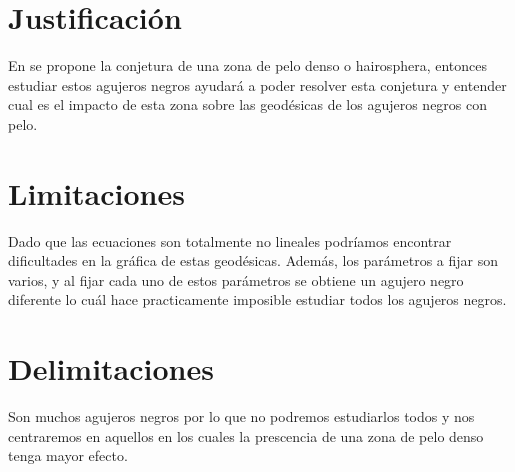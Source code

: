 \documentclass[../Main.tex]{subfiles}
\begin{document}
\section{Justificación}
En \cite{Nunez:1996xv} se propone la conjetura de una zona de pelo denso o hairosphera, entonces estudiar estos agujeros negros ayudará a poder resolver esta conjetura y entender cual es el impacto de esta zona sobre las geodésicas de los agujeros negros con pelo.

\section{Limitaciones}
Dado que las ecuaciones son totalmente no lineales podríamos encontrar dificultades en la gráfica de estas geodésicas. Además, los parámetros a fijar son varios, y al fijar cada uno de estos parámetros se obtiene un agujero negro diferente lo cuál hace practicamente imposible estudiar todos los agujeros negros. 

\section{Delimitaciones}
Son muchos agujeros negros por lo que no podremos estudiarlos todos y nos centraremos en aquellos en los cuales la prescencia de una zona de pelo denso tenga mayor efecto.







\end{document}
